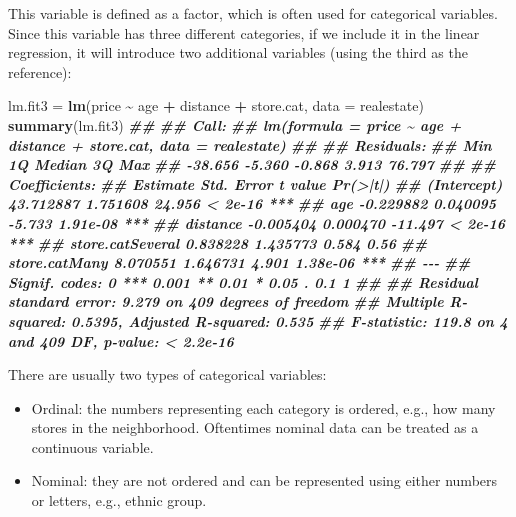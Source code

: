 \documentclass[
]{book}
\newenvironment{Shaded}{\begin{snugshade}}{\end{snugshade}}
\newcommand{\AttributeTok}[1]{\textcolor[rgb]{0.13,0.29,0.53}{#1}}
\newcommand{\DocumentationTok}[1]{\textcolor[rgb]{0.56,0.35,0.01}{\textbf{\textit{#1}}}}
\newcommand{\FunctionTok}[1]{\textcolor[rgb]{0.13,0.29,0.53}{\textbf{#1}}}
\newcommand{\NormalTok}[1]{#1}
\newcommand{\OtherTok}[1]{\textcolor[rgb]{0.56,0.35,0.01}{#1}}
\newcommand{\SpecialCharTok}[1]{\textcolor[rgb]{0.81,0.36,0.00}{\textbf{#1}}}
\providecommand{\tightlist}{%
  \setlength{\itemsep}{0pt}\setlength{\parskip}{0pt}}
\theoremstyle{definition}
\theoremstyle{definition}
\theoremstyle{definition}
\theoremstyle{definition}
\theoremstyle{remark}
\begin{document}
This variable is defined as a factor, which is often used for categorical variables. Since this variable has three different categories, if we include it in the linear regression, it will introduce two additional variables (using the third as the reference):

\begin{Shaded}
\begin{Highlighting}[]
\NormalTok{    lm.fit3 }\OtherTok{=} \FunctionTok{lm}\NormalTok{(price }\SpecialCharTok{\textasciitilde{}}\NormalTok{ age }\SpecialCharTok{+}\NormalTok{ distance }\SpecialCharTok{+}\NormalTok{ store.cat, }\AttributeTok{data =}\NormalTok{ realestate)}
    \FunctionTok{summary}\NormalTok{(lm.fit3)}
\DocumentationTok{\#\# }
\DocumentationTok{\#\# Call:}
\DocumentationTok{\#\# lm(formula = price \textasciitilde{} age + distance + store.cat, data = realestate)}
\DocumentationTok{\#\# }
\DocumentationTok{\#\# Residuals:}
\DocumentationTok{\#\#     Min      1Q  Median      3Q     Max }
\DocumentationTok{\#\# {-}38.656  {-}5.360  {-}0.868   3.913  76.797 }
\DocumentationTok{\#\# }
\DocumentationTok{\#\# Coefficients:}
\DocumentationTok{\#\#                   Estimate Std. Error t value Pr(\textgreater{}|t|)    }
\DocumentationTok{\#\# (Intercept)      43.712887   1.751608  24.956  \textless{} 2e{-}16 ***}
\DocumentationTok{\#\# age              {-}0.229882   0.040095  {-}5.733 1.91e{-}08 ***}
\DocumentationTok{\#\# distance         {-}0.005404   0.000470 {-}11.497  \textless{} 2e{-}16 ***}
\DocumentationTok{\#\# store.catSeveral  0.838228   1.435773   0.584     0.56    }
\DocumentationTok{\#\# store.catMany     8.070551   1.646731   4.901 1.38e{-}06 ***}
\DocumentationTok{\#\# {-}{-}{-}}
\DocumentationTok{\#\# Signif. codes:  0 \textquotesingle{}***\textquotesingle{} 0.001 \textquotesingle{}**\textquotesingle{} 0.01 \textquotesingle{}*\textquotesingle{} 0.05 \textquotesingle{}.\textquotesingle{} 0.1 \textquotesingle{} \textquotesingle{} 1}
\DocumentationTok{\#\# }
\DocumentationTok{\#\# Residual standard error: 9.279 on 409 degrees of freedom}
\DocumentationTok{\#\# Multiple R{-}squared:  0.5395, Adjusted R{-}squared:  0.535 }
\DocumentationTok{\#\# F{-}statistic: 119.8 on 4 and 409 DF,  p{-}value: \textless{} 2.2e{-}16}
\end{Highlighting}
\end{Shaded}

There are usually two types of categorical variables:

\begin{itemize}
\tightlist
\item
  Ordinal: the numbers representing each category is ordered, e.g., how many stores in the neighborhood. Oftentimes nominal data can be treated as a continuous variable.
\item
  Nominal: they are not ordered and can be represented using either numbers or letters, e.g., ethnic group.
\end{itemize}
\end{document}
